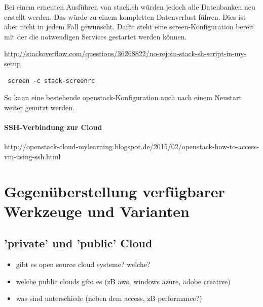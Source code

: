 \documentclass[a4paper,10pt]{article}
\numberwithin{figure}{section}
\numberwithin{table}{section}
\begin{document}
Bei einem erneuten Ausführen von stack.sh würden jedoch alle Datenbanken neu erstellt werden.
Das würde zu einem kompletten Datenverlust führen.
Dies ist aber nicht in jedem Fall gewünscht.
Dafür steht eine screen-Konfiguration bereit mit der die notwendigen Services gestartet werden können.

\url{http://stackoverflow.com/questions/36268822/no-rejoin-stack-sh-script-in-my-setup}

\begin{verbatim}
 screen -c stack-screenrc
\end{verbatim}

So kann eine bestehende openstack-Konfiguration auch nach einem Neustart weiter genutzt werden.

\paragraph{SSH-Verbindung zur Cloud}

http://openstack-cloud-mylearning.blogspot.de/2015/02/openstack-how-to-access-vm-using-ssh.html

\newpage













\section{Gegenüberstellung verfügbarer Werkzeuge und Varianten}


\subsection{'private' und 'public' Cloud}

\begin{itemize}
 \item gibt es open source cloud systeme? welche?
 \item welche public clouds gibt es (zB aws, windows azure, adobe creative)
 \item was sind unterschiede (neben dem access, zB performance?)
\end{itemize}

\end{document}
